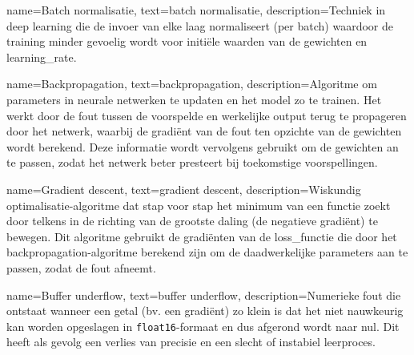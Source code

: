 {
    name={Batch normalisatie},
    text={batch normalisatie},
    description={Techniek in deep learning die de invoer van elke laag normaliseert (per batch) waardoor de training minder gevoelig wordt voor initiële waarden van de gewichten en \gls{learning_rate}. \autocite{Geron_2023}}
}

{
    name={Backpropagation},
    text={backpropagation},
    description={Algoritme om parameters in neurale netwerken te updaten en het model zo te trainen. Het werkt door de fout tussen de voorspelde en werkelijke output terug te propageren door het netwerk, waarbij de gradiënt van de fout ten opzichte van de gewichten wordt berekend. Deze informatie wordt vervolgens gebruikt om de gewichten an te passen, zodat het netwerk beter presteert bij toekomstige voorspellingen. \autocite{Geron_2023}}
}

{
    name={Gradient descent},
    text={gradient descent},
    description={Wiskundig optimalisatie-algoritme dat stap voor stap het minimum van een functie zoekt door telkens in de richting van de grootste daling (de negatieve gradiënt) te bewegen. Dit algoritme gebruikt de gradiënten van de \gls{loss_functie} die door het \gls{backpropagation}-algoritme berekend zijn om de daadwerkelijke parameters aan te passen, zodat de fout afneemt. \autocite{Geron_2023}}
}

{
    name={Buffer underflow},
    text={buffer underflow},
    description={Numerieke fout die ontstaat wanneer een getal (bv. een gradiënt) zo klein is dat het niet nauwkeurig kan worden opgeslagen in \texttt{float16}-formaat en dus afgerond wordt naar nul. Dit heeft als gevolg een verlies van precisie en een slecht of instabiel leerproces. \autocite{Micikevicius_2017}}
}